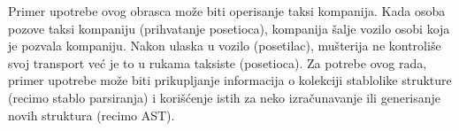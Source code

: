Primer upotrebe ovog obrasca može biti operisanje taksi kompanija. Kada osoba pozove taksi kompaniju (prihvatanje posetioca), kompanija šalje vozilo osobi koja je pozvala kompaniju. Nakon ulaska u vozilo (posetilac), mušterija ne kontroliše svoj transport već je to u rukama taksiste (posetioca). Za potrebe ovog rada, primer upotrebe može biti prikupljanje informacija o kolekciji stablolike strukture (recimo stablo parsiranja) i korišćenje istih za neko izračunavanje ili generisanje novih struktura (recimo AST). 

